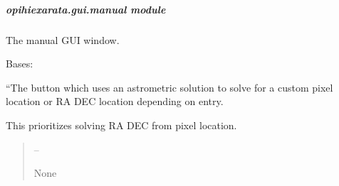\documentclass[letterpaper,11pt,english]{sphinxmanual}
\begin{document}
\sphinxstepscope


\subparagraph{opihiexarata.gui.manual module}
\label{\detokenize{code/opihiexarata.gui.manual:module-opihiexarata.gui.manual}}\label{\detokenize{code/opihiexarata.gui.manual:opihiexarata-gui-manual-module}}\label{\detokenize{code/opihiexarata.gui.manual::doc}}
\sphinxAtStartPar
The manual GUI window.

\begin{savenotes}\begin{fulllineitems}
\label{\detokenize{code/opihiexarata.gui.manual:opihiexarata.gui.manual.OpihiManualWindow}}
\pysigstartsignatures
{}
\pysigstopsignatures
\sphinxAtStartPar
Bases: 

\begin{savenotes}\begin{fulllineitems}
\label{\detokenize{code/opihiexarata.gui.manual:opihiexarata.gui.manual.OpihiManualWindow.__connect_push_button_astrometry_custom_solve}}
\pysigstartsignatures
{}
\pysigstopsignatures
\sphinxAtStartPar
“The button which uses an astrometric solution to solve for a
custom pixel location or RA DEC location depending on entry.

\sphinxAtStartPar
This prioritizes solving RA DEC from pixel location.
\begin{quote}\begin{description}
\sphinxAtStartPar
{} – 

\sphinxAtStartPar
None

\end{description}\end{quote}


\end{fulllineitems}
\end{savenotes}
\end{fulllineitems}
\end{savenotes}
\end{document}

